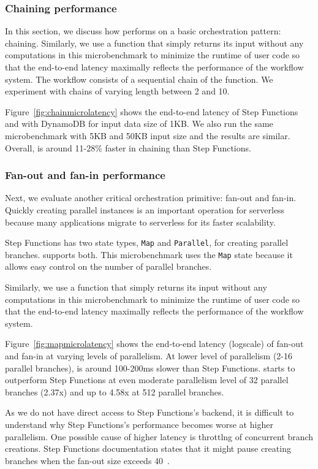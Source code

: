 \subsubsection{Chaining performance}

In this section, we discuss how \name{} performs on a basic orchestration
pattern: chaining. Similarly, we use a function that simply returns its input
without any computations in this microbenchmark to minimize the runtime of
user code so that the end-to-end latency maximally reflects the performance of
the workflow system. The workflow consists of a sequential chain of the
function. We experiment with chains of varying length between 2 and 10.

Figure~\ref{fig:chainmicrolatency} shows the end-to-end latency of Step
Functions and \name{} with DynamoDB for input data size of 1KB. We also run
the same microbenchmark with 5KB and 50KB input size and the results are
similar. Overall, \name{} is around 11-28\% faster in chaining than Step
Functions.

\subsubsection{Fan-out and fan-in performance}

Next, we evaluate another critical orchestration primitive: fan-out and
fan-in. Quickly creating parallel instances is an important operation for
serverless because many applications migrate to serverless for its faster
scalability.

Step Functions has two state types, \texttt{Map} and \texttt{Parallel}, for creating
parallel branches. \name{} supports both. This microbenchmark uses the
\texttt{Map} state because it allows easy control on the number of parallel
branches.

Similarly, we use a function that simply returns its input without any
computations in this microbenchmark to minimize the runtime of user code so
that the end-to-end latency maximally reflects the performance of the workflow
system.

Figure~\ref{fig:mapmicrolatency} shows the end-to-end latency (logscale) of
fan-out and fan-in at varying levels of parallelism. At lower level of
parallelism (2-16 parallel branches), \name{} is around 100-200ms slower than
Step Functions. \name{} starts to outperform Step Functions at even moderate parallelism level of 32
parallel branches (2.37x) and up to 4.58x at 512 parallel branches.

As we do not have direct access to Step Functions's backend, it is difficult to
understand why Step Functions's performance becomes worse at higher parallelism. One
possible cause of higher latency is throttlng of concurrent branch creations.
Step Functions documentation states that it might pause creating branches when the
fan-out size exceeds 40~\cite{aws-step-functions-map-state}.

